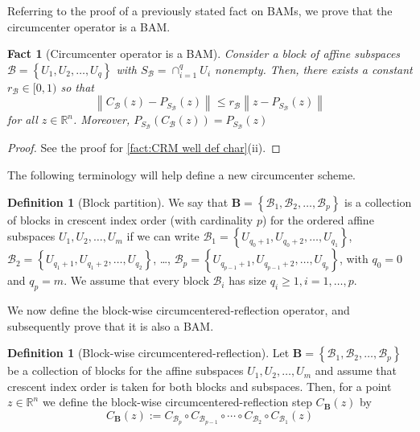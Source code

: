 \documentclass[smallextended,numbook,nospthms]{svjour3}
\theoremstyle{plain}
\newtheorem{fact}[theorem]{Fact}
\theoremstyle{definition}
\newtheorem{definition}[theorem]{Definition}
\def\RR{\mathds R}
\begin{document}
Referring to the proof of a previously stated fact on BAMs, we prove that the circumcenter operator is a BAM.
\begin{fact}[Circumcenter operator is a BAM]\label{fact:CRM oper BAM}
	Consider a block of affine subspaces $\mathcal{B}=\left\{U_{1}, U_{2}, \ldots, U_{q}\right\}$ with $S_{\mathcal{B}}=\cap_{i=1}^{q} U_{i}$ nonempty. Then, there exists a constant $r_{\mathcal{B}} \in[0,1)$ so that
	\[
	\left\|C_{\mathcal{B}}(z)-P_{S_{\mathcal{B}}}(z)\right\| \leq r_{\mathcal{B}}\left\|z-P_{S_{\mathcal{B}}}(z)\right\|
	\]
	for all $z \in \RR^{n}$. Moreover, $P_{S_{\mathcal{B}}}\left(C_{\mathcal{B}}(z)\right)=P_{S_{\mathcal{B}}}(z)$
\end{fact}
\begin{proof}
	See the proof for \cref{fact:CRM well def char}(ii).
\end{proof}

The following terminology will help define a new circumcenter scheme.
\begin{definition}[Block partition]\label{def:block part}
	We say that $\mathbf{B}=\left\{\mathcal{B}_{1}, \mathcal{B}_{2}, \ldots, \mathcal{B}_{p}\right\}$ is a collection of blocks in crescent index order (with cardinality $p$) for the ordered affine subspaces $U_{1}, U_{2}, \ldots, U_{m}$ if we can write $\mathcal{B}_{1}=\left\{U_{q_{0}+1}, U_{q_{0}+2}, \ldots, U_{q_{1}}\right\}$, $\mathcal{B}_{2}=\left\{U_{q_{1}+1}, U_{q_{1}+2}, \ldots, U_{q_{2}}\right\}$, \ldots, $\mathcal{B}_{p}=\left\{U_{q_{p-1}+1}, U_{q_{p-1}+2}, \ldots, U_{q_{p}}\right\}$, with $q_{0}=0$ and $q_{p}=m$. We assume that every block $\mathcal{B}_{i}$ has size $q_{i} \geq 1, i=1, \ldots, p$.
\end{definition}

We now define the block-wise circumcentered-reflection operator, and subsequently prove that it is also a BAM.
\begin{definition}[Block-wise circumcentered-reflection]\label{def:block-wise CRM}
	Let $\mathbf{B}=\left\{\mathcal{B}_{1}, \mathcal{B}_{2}, \ldots, \mathcal{B}_{p}\right\}$ be a collection of blocks for the affine subspaces $U_{1}, U_{2}, \ldots, U_{m}$ and assume that crescent index order is taken for both blocks and subspaces. Then, for a point $z \in \RR^{n}$ we define the block-wise circumcentered-reflection step $C_{\mathbf{B}}(z)$ by
	\[
	C_{\mathbf{B}}(z):=C_{\mathcal{B}_{p}} \circ C_{\mathcal{B}_{p-1}} \circ \cdots \circ C_{\mathcal{B}_{2}} \circ C_{\mathcal{B}_{1}}(z)
	\]
\end{definition}
\end{document}
